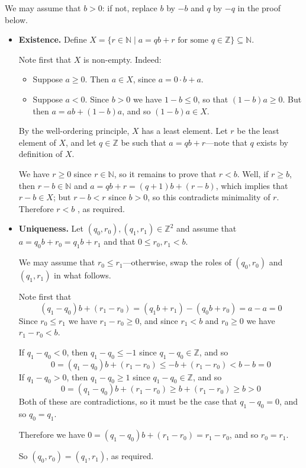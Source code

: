 \begin{cproof}
We may assume that $b>0$: if not, replace $b$ by $-b$ and $q$ by $-q$ in the proof below.

\begin{itemize}
\item \textbf{Existence.} Define $X = \{ r \in \mathbb{N} \mid a = qb+r \text{ for some } q \in \mathbb{Z} \} \subseteq \mathbb{N}$.

Note first that $X$ is non-empty. Indeed:
\begin{itemize}
\item Suppose $a \ge 0$. Then $a \in X$, since $a = 0 \cdot b + a$.
\item Suppose $a<0$. Since $b > 0$ we have $1-b \le 0$, so that $(1-b)a \ge 0$. But then $a = ab + (1-b)a$, and so $(1-b)a \in X$.
\end{itemize}

By the well-ordering principle, $X$ has a least element. Let $r$ be the least element of $X$, and let $q \in \mathbb{Z}$ be such that $a=qb+r$---note that $q$ exists by definition of $X$.

We have $r \ge 0$ since $r \in \mathbb{N}$, so it remains to prove that $r<b$. Well, %
if $r \ge b$, then $r-b \in \mathbb{N}$ and $a = qb+r = (q+1)b + (r-b)$, which implies that $r-b \in X$; but $r-b<r$ since $b>0$, so this contradicts minimality of $r$. Therefore $r<b$
, as required.

\item \textbf{Uniqueness.} Let $(q_0,r_0),(q_1,r_1) \in \mathbb{Z}^2$ and assume that $a=q_0b+r_0 = q_1b+r_1$ and that $0 \le r_0,r_1 < b$.

We may assume that $r_0 \le r_1$---otherwise, swap the roles of $(q_0,r_0)$ and $(q_1,r_1)$ in what follows.

Note first that
\[(q_1-q_0)b + (r_1-r_0) = (q_1b+r_1) - (q_0b+r_0) = a-a = 0 \]
Since $r_0 \le r_1$ we have $r_1-r_0 \ge 0$, and since $r_1<b$ and $r_0 \ge 0$ we have $r_1-r_0 < b$.

If $q_1-q_0<0$, then $q_1-q_0 \le -1$ since $q_1-q_0 \in \mathbb{Z}$, and so
\[ 0 = (q_1-q_0) b + (r_1-r_0) \le -b + (r_1-r_0) < b - b = 0 \]
If $q_1-q_0>0$, then $q_1-q_0 \ge 1$ since $q_1-q_0 \in \mathbb{Z}$, and so
\[ 0 = (q_1-q_0) b + (r_1-r_0) \ge b + (r_1-r_0) \ge b > 0 \]
Both of these are contradictions, so it must be the case that $q_1-q_0 = 0$, and so $q_0=q_1$.

Therefore we have $0 = (q_1-q_0)b+(r_1-r_0) = r_1-r_0$, and so $r_0=r_1$.

So $(q_0,r_0)=(q_1,r_1)$, as required.
\end{itemize}
\vspace{-20pt}
\end{cproof}

